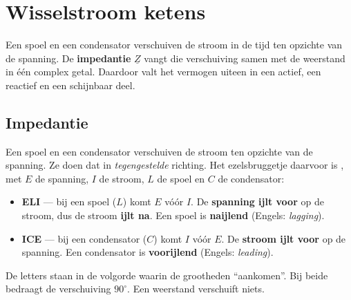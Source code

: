 \documentclass[a4paper,11pt]{article}
\begin{document}
\section{Wisselstroom ketens}

Een spoel en een condensator verschuiven de stroom in de tijd ten opzichte van de spanning. De
\textbf{impedantie} $\underline{Z}$ vangt die verschuiving samen met de weerstand in \'e\'en complex
getal. Daardoor valt het vermogen uiteen in een actief, een reactief en een schijnbaar deel.

\subsection{Impedantie}

Een spoel en een condensator verschuiven de stroom ten opzichte van de spanning. Ze doen dat in
\emph{tegengestelde} richting. Het ezelsbruggetje daarvoor is ,
met $E$ de spanning, $I$ de stroom, $L$ de spoel en $C$ de condensator:

\begin{itemize}
    \item \textbf{ELI} --- bij een spoel ($L$) komt $E$ vóór $I$. De \textbf{spanning ijlt voor} op
          de stroom, dus de stroom \textbf{ijlt na}. Een spoel is \textbf{naijlend}
          (Engels: \emph{lagging}).
    \item \textbf{ICE} --- bij een condensator ($C$) komt $I$ vóór $E$. De \textbf{stroom ijlt voor}
          op de spanning. Een condensator is \textbf{voorijlend} (Engels: \emph{leading}).
\end{itemize}

De letters staan in de volgorde waarin de grootheden ``aankomen''. Bij beide bedraagt de
verschuiving $90^\circ$. Een weerstand verschuift niets.
\end{document}
